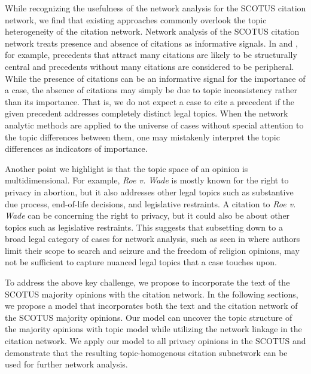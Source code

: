 While recognizing the usefulness of the network analysis for the SCOTUS citation network, we find that existing approaches commonly overlook the topic heterogeneity of the citation network.
Network analysis of the SCOTUS citation network treats presence and absence of citations as informative signals.
In \cite{fowler2007network} and \cite{fowler2008authority}, for example, precedents that attract many citations are likely to be structurally central and precedents without many citations are considered to be peripheral.
While the presence of citations can be an informative signal for the importance of a case, the absence of citations may simply be due to topic inconsistency rather than its importance.
That is, we do not expect a case to cite a precedent if the given precedent addresses completely distinct legal topics. 
When the network analytic methods are applied to the universe of cases without special attention to the topic differences between them, one may mistakenly interpret the topic differences as indicators of importance.

Another point we highlight is that the topic space of an opinion is multidimensional. 
For example, \textit{Roe v. Wade} is mostly known for the right to privacy in abortion, but it also addresses other legal topics such as substantive due process, end-of-life decisions, and legislative restraints.
A citation to \textit{Roe v. Wade} can be concerning the right to privacy, but it could also be about other topics such as legislative restraints. 
This suggests that subsetting down to a broad legal category of cases for network analysis, such as seen in \cite{clark2010locating} where authors limit their scope to search and seizure and the freedom of religion opinions, may not be sufficient to capture nuanced legal topics that a case touches upon. 

To address the above key challenge, we propose to incorporate the text of the SCOTUS majority opinions with the citation network. 
In the following sections, we propose a model that incorporates both the text and the citation network of the SCOTUS majority opinions. 
Our model can uncover the topic structure of the majority opinions with topic model while utilizing the network linkage in the citation network.
We apply our model to all privacy opinions in the SCOTUS and demonstrate that the resulting topic-homogenous citation subnetwork can be used for further network analysis.

